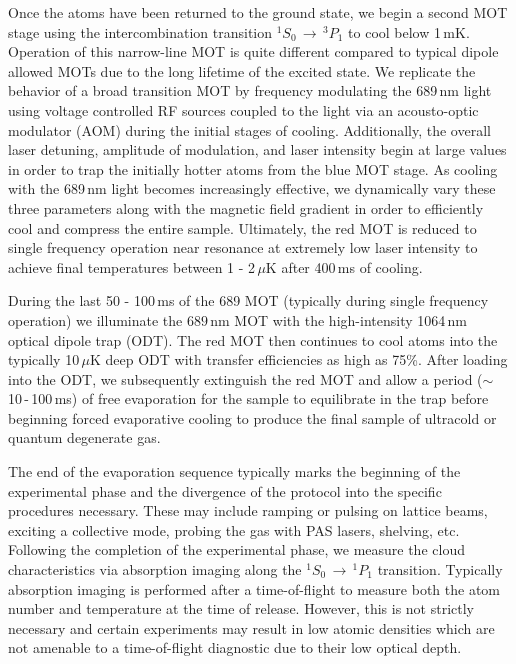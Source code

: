 Once the atoms have been returned to the ground state, we begin a second MOT stage using the intercombination transition $^1S_0\,\rightarrow\,^3P_1$ to cool below 1\,mK.
Operation of this narrow-line MOT is quite different compared to typical dipole allowed MOTs due to the long lifetime of the excited state.
We replicate the behavior of a broad transition MOT by frequency modulating the 689\,nm light using voltage controlled RF sources coupled to the light via an acousto-optic modulator (AOM) during the initial stages of cooling.
Additionally, the overall laser detuning, amplitude of modulation, and laser intensity begin at large values in order to trap the initially hotter atoms from the blue MOT stage. 
As cooling with the 689\,nm light becomes increasingly effective, we dynamically vary these three parameters along with the magnetic field gradient in order to efficiently cool and compress the entire sample.
Ultimately, the red MOT is reduced to single frequency operation near resonance at extremely low laser intensity to achieve final temperatures between 1 - 2\,$\mu$K after 400\,ms of cooling.

During the last 50 - 100\,ms of the 689 MOT (typically during single frequency operation) we illuminate the $689\,$nm MOT with the high-intensity 1064\,nm optical dipole trap (ODT).
The red MOT then continues to cool atoms into the typically 10\,$\mu$K deep ODT with transfer efficiencies as high as 75\%. 
After loading into the ODT, we subsequently extinguish the red MOT and allow a period ($\sim$10\,-\,100\,ms) of free evaporation for the sample to equilibrate in the trap before beginning forced evaporative cooling to produce the final sample of ultracold or quantum degenerate gas.

The end of the evaporation sequence typically marks the beginning of the experimental phase and the divergence of the protocol into the specific procedures necessary. 
These may include ramping or pulsing on lattice beams, exciting a collective mode, probing the gas with PAS lasers, shelving, etc. 
Following the completion of the experimental phase, we measure the cloud characteristics via absorption imaging along the $^1S_0\,\rightarrow\,^1P_1$ transition. 
Typically absorption imaging is performed after a time-of-flight to measure both the atom number and temperature at the time of release. 
However, this is not strictly necessary and certain experiments may result in low atomic densities which are not amenable to a time-of-flight diagnostic due to their low optical depth.

